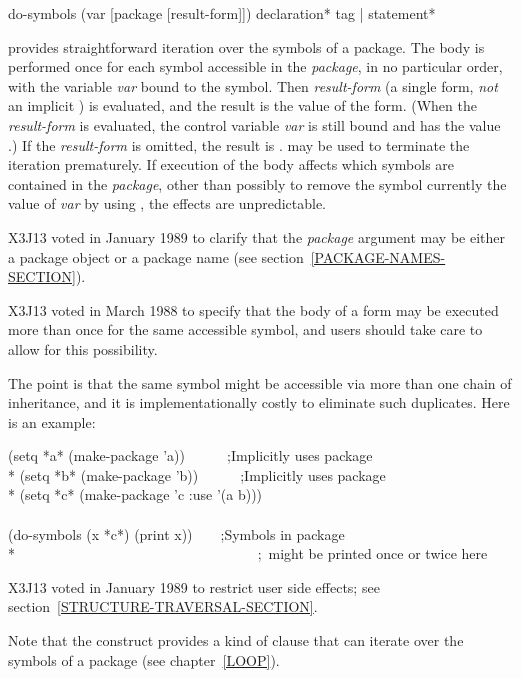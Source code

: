 \begin{defmac}
do-symbols (var [package [result-form]])
           {declaration}* {tag | statement}*

 provides straightforward iteration over the symbols of a
package.  The body is performed once for each symbol accessible in the
{\it package}, in no particular order, with the variable {\it var} bound to
the symbol.  Then {\it result-form} (a single form, {\it not} an implicit
) is evaluated, and the result is the value of the
 form.  (When the {\it result-form} is evaluated, the control
variable {\it var} is still bound and has the value {\false}.)  If the
{\it result-form} is omitted, the result is {\false}.   may be used
to terminate the iteration prematurely.  If execution of the body affects
which symbols are contained in the {\it package}, other than possibly to
remove the symbol currently the value of {\it var} by using ,
the effects are unpredictable.

\begin{new}
X3J13 voted in January 1989
to clarify that the {\it package} argument may be either a package object
or a package name (see section~\ref{PACKAGE-NAMES-SECTION}).
\end{new}

\begin{new}
X3J13 voted in March 1988
to specify that the body of a 
form may be executed more than once for the same accessible symbol, and users
should take care to allow for this possibility.

The point is that the same symbol might be accessible via more than one
chain of inheritance, and it is implementationally costly to eliminate
such duplicates.  Here is an example:
\begin{lisp}
(setq *a* (make-package 'a))~~~~~~;{\rm Implicitly uses package } \\*
(setq *b* (make-package 'b))~~~~~~;{\rm Implicitly uses package } \\*
(setq *c* (make-package 'c :use '(a b))) \\
\\
(do-symbols (x *c*) (print x))~~~~;{\rm Symbols in package } \\*
~~~~~~~~~~~~~~~~~~~~~~~~~~~~~~~~~~;~{\rm might be printed once or twice here}
\end{lisp}

X3J13 voted in January 1989
to restrict user side effects; see section~\ref{STRUCTURE-TRAVERSAL-SECTION}.
\end{new}
\begin{new}
Note that the  construct provides a kind of  clause that
can iterate over the symbols of a package (see chapter~\ref{LOOP}).
\end{new}
\end{defmac}

